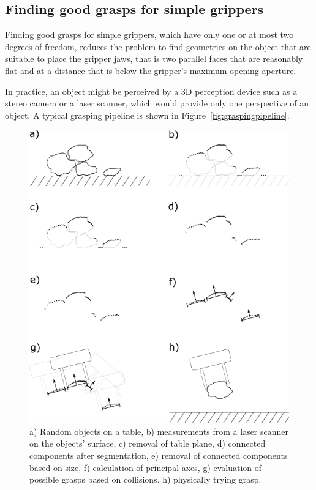 \subsection{Finding good grasps for simple grippers}
Finding good grasps for simple grippers, which have only one or at most two degrees of freedom, reduces the problem to find geometries on the object that are suitable to place the gripper jaws, that is two parallel faces that are reasonably flat and at a distance that is below the gripper's maximum opening aperture. 

In practice, an object might be perceived by a 3D perception device such as a stereo camera or a laser scanner, which would provide only one perspective of an object. A typical grasping pipeline is shown in Figure~\ref{fig:graspingpipeline}. 

\begin{figure}
\includegraphics[width=\columnwidth]{figs/graspingpointcloud}
\caption{a) Random objects on a table, b) measurements from a laser scanner on the objects' surface, c) removal of table plane, d) connected components after segmentation, e) removal of connected components based on size, f) calculation of principal axes, g) evaluation of possible grasps based on collisions, h) physically trying grasp.\label{fig:graspalgorithm}} 
\end{figure}

